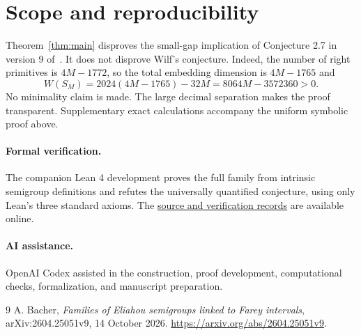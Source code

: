 \documentclass[11pt]{article}
\begin{document}
\section{Scope and reproducibility}
Theorem~\ref{thm:main} disproves the small-gap implication of
Conjecture 2.7 in version 9 of~\cite{Bacher}. It does not disprove
Wilf's conjecture. Indeed, the number of right primitives is
$4M-1772$, so the total embedding dimension is $4M-1765$ and
\[
 W(S_M)=2024(4M-1765)-32M=8064M-3572360>0.
\]
No minimality claim is made. The large decimal separation makes the
proof transparent. Supplementary exact calculations accompany the
uniform symbolic proof above.

\paragraph{Formal verification.}
The companion Lean 4 development proves the full family from intrinsic
semigroup definitions and refutes the universally quantified conjecture,
using only Lean's three standard axioms. The
\href{https://github.com/Onetkn/eliahou-small-gap-counterexample}{source and verification records}
are available online.

\paragraph{AI assistance.}
OpenAI Codex assisted in the construction, proof development, computational
checks, formalization, and manuscript preparation.

\begin{thebibliography}{9}
A. Bacher, \emph{Families of Eliahou semigroups linked to Farey intervals},
arXiv:2604.25051v9, 14 October 2026.
\url{https://arxiv.org/abs/2604.25051v9}.
\end{thebibliography}
\end{document}
